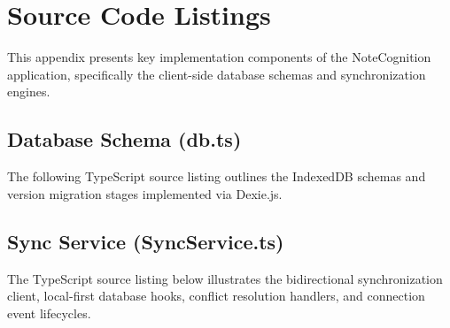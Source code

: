 \documentclass[12pt, a4paper, oneside]{report}
\begin{document}
\chapter{Source Code Listings}
This appendix presents key implementation components of the NoteCognition application, specifically the client-side database schemas and synchronization engines.

\section{Database Schema (db.ts)}
The following TypeScript source listing outlines the IndexedDB schemas and version migration stages implemented via Dexie.js.


\section{Sync Service (SyncService.ts)}
The TypeScript source listing below illustrates the bidirectional synchronization client, local-first database hooks, conflict resolution handlers, and connection event lifecycles.


\end{document}
